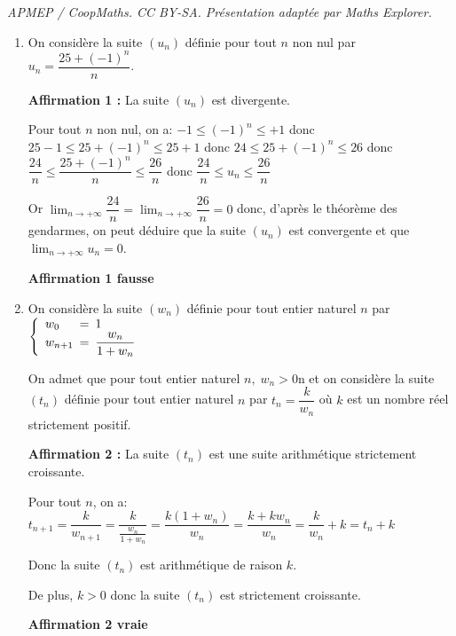 \documentclass[10pt]{article}
\providecommand{\ds}{\displaystyle}
\begin{document}
\noindent\textit{APMEP / CoopMaths. CC BY-SA. Présentation adaptée par Maths Explorer.}\par\medskip
\medskip

\begin{enumerate}
\item On considère la suite $(u_n)$ définie pour tout $n$ non nul par 
$u_n = \dfrac{25 + (- 1)^n}{n}.$

\textbf{Affirmation 1 :} La suite $(u_n)$ est divergente.

\medskip

Pour tout $n$ non nul, on a:
$ -1 \leqslant (-1)^n \leqslant +1$
donc $ 25-1 \leqslant 25+(-1)^n \leqslant 25+1$
donc $ 24 \leqslant 25+(-1)^n \leqslant 26$
donc $ \dfrac{24}{n} \leqslant \dfrac{25+(-1)^n}{n} \leqslant \dfrac{26}{n}$
donc $ \dfrac{24}{n} \leqslant u_n \leqslant \dfrac{26}{n}$

Or $\ds\lim_{n\to +\infty} \dfrac{24}{n} = \ds\lim_{n\to +\infty} \dfrac{26}{n} = 0$ donc, d'après le théorème des gendarmes, on peut déduire que la suite $(u_n)$ est convergente et que $\ds\lim_{n\to +\infty} u_n=0$.

\hfill \textbf{Affirmation 1 fausse}

\medskip

\item On considère la suite $(w_n)$ définie pour tout entier naturel $n$ par $\left\{\begin{array}{l !{=}  l}
w_0&1\\w_{n+1}&\dfrac{w_n}{1 + w_n}
\end{array}\right.$

On admet que pour tout entier naturel $n,\; w_n > 0$n et on considère la suite $(t_n)$ définie pour tout entier naturel $n$ par $t_n =\dfrac{k}{w_n}$ où $k$ est un nombre réel strictement positif.

\textbf{Affirmation 2 :} La suite $(t_n)$ est une suite arithmétique strictement croissante.

\medskip

Pour tout $n$, on a: $t_{n+1}
= \dfrac{k}{w_{n+1}}
= \dfrac{k}{\frac{w_n}{1+w_n}}
= \dfrac{k\left (1+w_n\right )}{w_n}
= \dfrac{k+kw_n}{w_n}
=\dfrac{k}{w_n} +k
=t_n+k$

Donc la suite $(t_n)$ est arithmétique de raison $k$.

De plus, $k>0$ donc la suite $(t_n)$ est strictement croissante.

\hfill \textbf{Affirmation 2 vraie}

\medskip


\end{enumerate}
\end{document}
